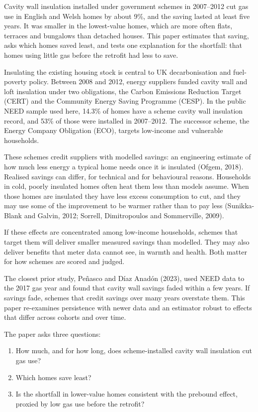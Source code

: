 \documentclass[11pt,a4paper]{article}
\providecommand{\tightlist}{\setlength{\itemsep}{0pt}\setlength{\parskip}{0pt}}
\begin{document}
Cavity wall insulation installed under government schemes in 2007--2012 cut gas use in English and Welsh homes by about 9\%, and the saving lasted at least five years. It was smaller in the lowest-value homes, which are more often flats, terraces and bungalows than detached houses. This paper estimates that saving, asks which homes saved least, and tests one explanation for the shortfall: that homes using little gas before the retrofit had less to save.

Insulating the existing housing stock is central to UK decarbonisation and fuel-poverty policy. Between 2008 and 2012, energy suppliers funded cavity wall and loft insulation under two obligations, the Carbon Emissions Reduction Target (CERT) and the Community Energy Saving Programme (CESP). In the public NEED sample used here, 14.3\% of homes have a scheme cavity wall insulation record, and 53\% of those were installed in 2007--2012. The successor scheme, the Energy Company Obligation (ECO), targets low-income and vulnerable households.

These schemes credit suppliers with modelled savings: an engineering estimate of how much less energy a typical home needs once it is insulated (Ofgem, 2018). Realised savings can differ, for technical and for behavioural reasons. Households in cold, poorly insulated homes often heat them less than models assume. When those homes are insulated they have less excess consumption to cut, and they may use some of the improvement to be warmer rather than to pay less (Sunikka-Blank and Galvin, 2012; Sorrell, Dimitropoulos and Sommerville, 2009).

If these effects are concentrated among low-income households, schemes that target them will deliver smaller measured savings than modelled. They may also deliver benefits that meter data cannot see, in warmth and health. Both matter for how schemes are scored and judged.

The closest prior study, Peñasco and Díaz Anadón (2023), used NEED data to the 2017 gas year and found that cavity wall savings faded within a few years. If savings fade, schemes that credit savings over many years overstate them. This paper re-examines persistence with newer data and an estimator robust to effects that differ across cohorts and over time.

The paper asks three questions:

\begin{enumerate}
\def\labelenumi{\arabic{enumi}.}
\tightlist
\item
  How much, and for how long, does scheme-installed cavity wall insulation cut gas use?
\item
  Which homes save least?
\item
  Is the shortfall in lower-value homes consistent with the prebound effect, proxied by low gas use before the retrofit?
\end{enumerate}
\end{document}
